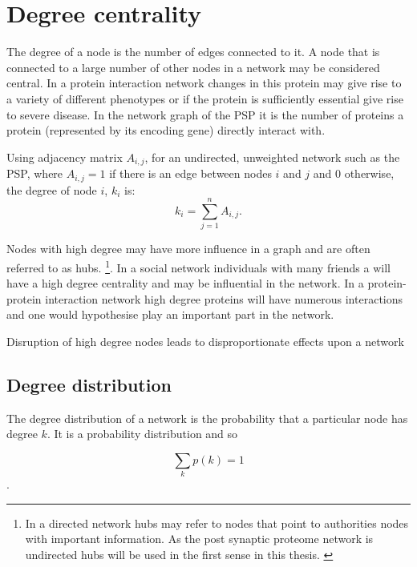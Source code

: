 \section{Degree centrality}
\label{sec:degree centrality}

The degree of a node is the number of edges connected to it. A node that is connected to a large number of other nodes in a network may be considered central. In a protein interaction network changes in this protein may give rise to a variety of different phenotypes or if the protein is sufficiently essential give rise to severe disease.  In the network graph of the PSP it is the number of proteins a protein (represented by its encoding gene) directly interact with.


Using adjacency matrix $A_{i,j}$, for an undirected, unweighted network such as the PSP,  where $A_{i,j}=1$  if there is an edge between nodes $i$ and $j$ and 0 otherwise, the degree of node $i$, $k_i$ is\cite{boccaletti2006complex}:
\begin{equation}
k_i = \sum_{j=1}^n A_{i,j}.
\label{Equation:Degree_from_adjacency}
\end{equation}

 Nodes with high degree may have more influence in a graph and are often referred to as hubs. \footnote{In a directed network hubs may refer to nodes that point to authorities nodes with important information. As the post synaptic proteome network is undirected hubs will be used in the first sense in this thesis. \cite{kleinberg1999authoritative}}.  In a social network  individuals with many friends a will have a high degree centrality and may be influential in the network. In a protein-protein interaction network high degree proteins will have numerous interactions and one would hypothesise play an important part in the network. 
 
 Disruption of high degree nodes leads to disproportionate effects upon a network \cite{jeong2001lethality} \cite{albert2000error} 


\subsection{Degree distribution}
\label{sec:degree distribution}
The degree distribution of a network is the probability that a particular node has degree $k$. It is a probability distribution and so

\begin{equation}
    \sum_k p(k)=1
\end{equation}.

